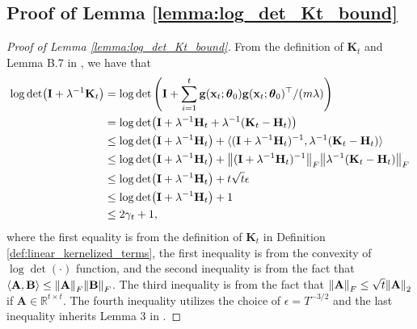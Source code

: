 \subsection{Proof of Lemma \ref{lemma:log_det_Kt_bound}}
\label{log_det_Kt_bound_proof}
\begin{proof}[Proof of Lemma \ref{lemma:log_det_Kt_bound}]

From the definition of $\mathbf{K}_t$ and Lemma B.7 in \citet{zhou2020neural}, we have that
\begin{equation*}
\begin{split}
    \log \det(\mathbf{I}+\lambda^{-1}\mathbf{K}_{t})
    & = \log\det \left(\mathbf{I}+\sum_{i=1}^{t}\mathbf{g}({\mathbf{x}_t};\boldsymbol{\theta}_0)\mathbf{g}({\mathbf{x}_t};\boldsymbol{\theta}_0)^\top/(m\lambda)\right) \\
    & = \log \det(\mathbf{I}+\lambda^{-1}\mathbf{H}_t + \lambda^{-1}(\mathbf{K}_t - \mathbf{H}_t))\\
    & \leq \log \det (\mathbf{I}+\lambda^{-1}\mathbf{H}_t)  + \langle (\mathbf{I}+\lambda^{-1}\mathbf{H}_t)^{-1}, \lambda^{-1}(\mathbf{K}_t - \mathbf{H}_t) \rangle \\
    & \leq \log \det (\mathbf{I}+\lambda^{-1}\mathbf{H}_t)  + \norm{(\mathbf{I}+\lambda^{-1}\mathbf{H}_t)^{-1}}_F \norm{ \lambda^{-1}(\mathbf{K}_t - \mathbf{H}_t)}_F \\
    & \leq \log \det (\mathbf{I}+\lambda^{-1}\mathbf{H}_t) + t\sqrt{t} \epsilon \\
    & \leq \log \det (\mathbf{I}+\lambda^{-1}\mathbf{H}_t) + 1 \\
    & \leq 2 \gamma_t + 1, 
\end{split}
\end{equation*}
where the first equality is from the definition of $\mathbf{K}_t$ in Definition \ref{def:linear_kernelized_terms}, the first inequality is from the convexity of $\log \det(\cdot)$ function,
and the second inequality is from the fact that $\langle \mathbf{A}, \mathbf{B} \rangle \le \norm{\mathbf{A}}_F \norm{\mathbf{B}}_F$. The third inequality is
from the fact that $\norm{\mathbf{A}}_F \le \sqrt{t} \norm{\mathbf{A}}_2$ if $\mathbf{A} \in \mathbb{R}^{t \times t}$. The fourth inequality utilizes the choice of $\epsilon = T^{-3/2}$ and the last inequality inherits Lemma 3 in \citet{chowdhury2017kernelized}.
\end{proof}

